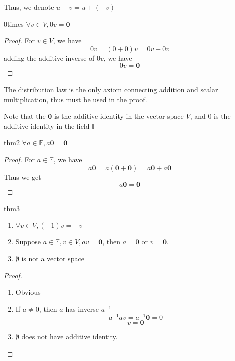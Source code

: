 \documentclass[../main.tex]{subfiles}
\begin{document}
Thus, we denote $u-v=u+(-v)$ 
\begin{theorem}{}{0times}
$\forall v \in V, 0v=\boldsymbol{0}$
\end{theorem}
\begin{proof}
For $v \in V$, we have
\begin{equation*}
0v=(0+0)v=0v+0v
\end{equation*}
adding the additive inverse of $0v$, we have
\begin{equation*}
0v=\boldsymbol{0}
\end{equation*}
\end{proof}
\begin{remark}
The distribution law is the only axiom connecting addition and scalar multiplication, thus must be used in the proof.

Note that the $\boldsymbol{0}$ is the additive identity in the vector space $V$, and $0$ is the additive identity in the field $\mathbb{F}$
\end{remark}

\begin{example}{}{thm2}
$\forall a \in \mathbb{F}, a \boldsymbol{0} = \boldsymbol{0}$
\end{example}
\begin{proof}
For $a \in \mathbb{F}$, we have 
\begin{equation*}
a \boldsymbol{0} = a(\boldsymbol{0}+ \boldsymbol{0}) = a \boldsymbol{0} + a \boldsymbol{0}
\end{equation*}
Thus we get
\begin{equation*}
a \boldsymbol{0} = \boldsymbol{0}
\end{equation*}
\end{proof}

\begin{example}{}{thm3}
\begin{enumerate}
	\item $\forall v \in V, (-1)v=-v$
	\item Suppose $a \in  \mathbb{F},v \in V, av=\boldsymbol{0}$, then $a=0$ or $v=\boldsymbol{0}$.
	\item $\emptyset $ is not a vector space
\end{enumerate}
\end{example}
\begin{proof}
\begin{enumerate}
	\item Obvious
	\item If $a \neq 0$, then $a$ has inverse $a^{-1}$
		\begin{equation*}
		a^{-1}av = a^{-1} \boldsymbol{0} = 0
		\end{equation*}
		\begin{equation*}
		v=\boldsymbol{0}
		\end{equation*}
	\item $\emptyset $ does not have additive identity.
\end{enumerate}
\end{proof}
\end{document}
